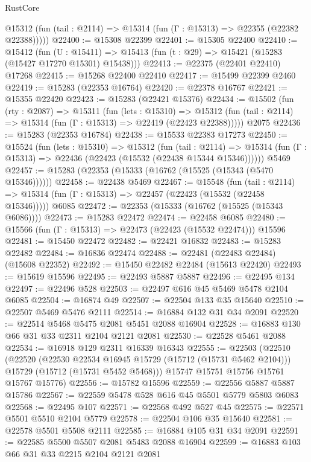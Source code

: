 \begin{lexlean}{RustCore}
\begin{coremodule}
      @15312 (fun (tail : @2114) => @15314 (fun (Γ : @15313) => @22355 (@22382 @22388)))))
@22400 := @15308 @22399
@22401 := @15305 @22400
@22410 := @15412
    (fun (U : @15411) => @15413 (fun (t : @29) => @15421 (@15283 (@15427 @17270 @15301) @15438)))
@22413 := @22375 (@22401 @22410) @17268
@22415 := @15268 @22400 @22410
@22417 := @15499 @22399 @2460
@22419 := @15283 (@22353 @16764)
@22420 := @22378 @16767
@22421 := @15355 @22420
@22423 := @15283 (@22421 @15376)
@22434 := @15502
    (fun (rty : @2087) =>
    @15311
      (fun (lets : @15310) =>
      @15312 (fun (tail : @2114) => @15314 (fun (Γ : @15313) => @22419 (@22423 @22388)))))
    @2075
@22436 := @15283 (@22353 @16784)
@22438 := @15533 @22383 @17273
@22450 := @15524
    (fun (lets : @15310) =>
    @15312
      (fun (tail : @2114) =>
      @15314 (fun (Γ : @15313) => @22436 (@22423 (@15532 (@22438 @15344 @15346))))))
    @5469
@22457 := @15283 (@22353 (@15333 (@16762 (@15525 (@15343 (@5470 @15346))))))
@22458 := @22438 @5469
@22467 := @15548
    (fun (tail : @2114) => @15314 (fun (Γ : @15313) => @22457 (@22423 (@15532 (@22458 @15346)))))
    @6085
@22472 := @22353 (@15333 (@16762 (@15525 (@15343 @6086))))
@22473 := @15283 @22472
@22474 := @22458 @6085
@22480 := @15566 (fun (Γ : @15313) => @22473 (@22423 (@15532 @22474))) @15596
@22481 := @15450 @22472
@22482 := @22421 @16832
@22483 := @15283 @22482
@22484 := @16836 @22474
@22488 := @22481 (@22483 @22484) (@15608 @22352)
@22492 := @15450 @22482 @22484 (@15613 @22420)
@22493 := @15619 @15596
@22495 := @22493 @5887 @5887
@22496 := @22495 @134
@22497 := @22496 @528
@22503 := @22497 @616 @45 @5469 @5478 @2104 @6085
@22504 := @16874 @49
@22507 := @22504 @133 @35 @15640
@22510 := @22507 @5469 @5476 @2111
@22514 := @16884 @132 @31 @34 @2091
@22520 := @22514 @5468 @5475 @2081 @5451 @2088 @16904
@22528 := @16883 @130 @66 @31 @33 @2311 @2104 @2121 @2081
@22530 := @22528 @5461 @2088
@22534 := @16918 @129 @2311 @16339 @16343
@22555 := @22503
    (@22510
      (@22520
        (@22530 @22534 @16945 @15729 (@15712 (@15731 @5462 @2104)))
        @15729
        (@15712 (@15731 @5452 @5468)))
      @15747
      @15751
      @15756
      @15761
      @15767
      @15776)
@22556 := @15782 @15596
@22559 := @22556 @5887 @5887 @15786
@22567 := @22559 @5478 @528 @616 @45 @5501 @5779 @5803 @6083
@22568 := @22495 @107
@22571 := @22568 @492 @527 @45
@22575 := @22571 @5501 @5510 @2104 @5779
@22578 := @22504 @106 @35 @15640
@22581 := @22578 @5501 @5508 @2111
@22585 := @16884 @105 @31 @34 @2091
@22591 := @22585 @5500 @5507 @2081 @5483 @2088 @16904
@22599 := @16883 @103 @66 @31 @33 @2215 @2104 @2121 @2081

\end{coremodule}
\end{lexlean}
